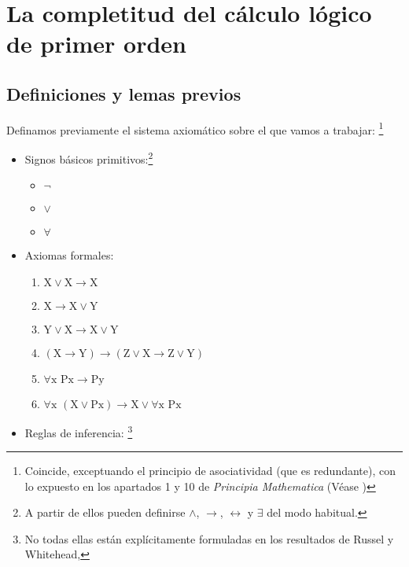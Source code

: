 
\chapter{La completitud del cálculo lógico de primer orden}

\section{Definiciones y lemas previos}

Definamos previamente el sistema axiomático sobre el que vamos a trabajar:
\footnote{Coincide, exceptuando el principio de asociatividad (que es redundante), con lo expuesto en los apartados 1 y 10 de 
\textit{Principia Mathematica} (Véase \cite{an1910principia})}
\begin{itemize}
    \item Signos básicos primitivos:\footnote{A partir de ellos pueden definirse $\wedge$, $\rightarrow$, $\leftrightarrow$ y 
            $\exists$ del modo habitual.}
            \begin{itemize}
                \item $\lnot$
                \item $\vee$
                \item $\forall$
            \end{itemize}
    \item Axiomas formales:
            \begin{enumerate}
                \item $ \text{X} \vee \text{X} \rightarrow \text{X} $
                \item $ \text{X} \rightarrow \text{X} \vee \text{Y} $
                \item $ \text{Y} \vee \text{X} \rightarrow \text{X} \vee \text{Y} $
                \item $ (\text{X} \rightarrow \text{Y}) \rightarrow (\text{Z} \vee \text{X} \rightarrow \text{Z} \vee \text{Y}) $
                \item $ \forall \text{x Px} \rightarrow \text{Py} $
                \item $ \forall \text{x } (\text{X} \vee \text{Px}) \rightarrow \text{X} \vee \forall \text{x Px} $
            \end{enumerate}
    \item Reglas de inferencia: \footnote{No todas ellas están explícitamente formuladas en los resultados de Russel y Whitehead,
}
\end{itemize}
